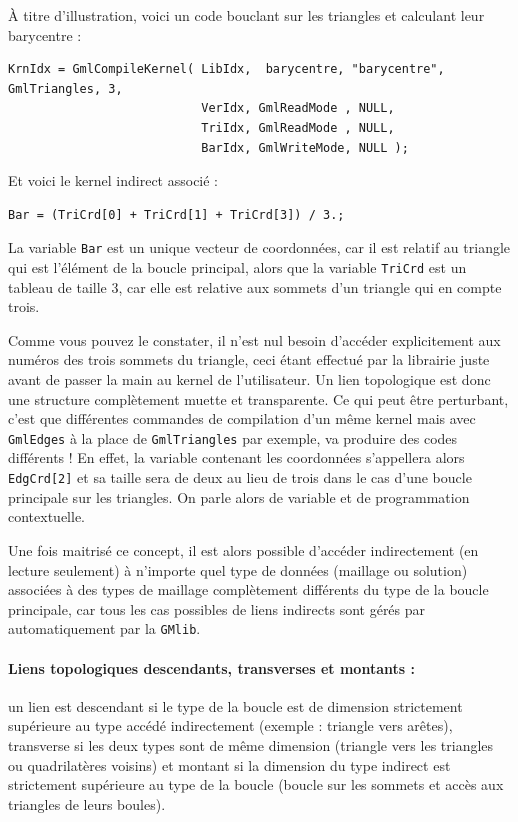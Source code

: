 \documentclass[a4paper,12pt]{article}
\begin{document}
À titre d'illustration, voici un code bouclant sur les triangles et calculant leur barycentre :

\begin{tt}
\begin{verbatim}
KrnIdx = GmlCompileKernel( LibIdx,  barycentre, "barycentre", GmlTriangles, 3,
                           VerIdx, GmlReadMode , NULL,
                           TriIdx, GmlReadMode , NULL,
                           BarIdx, GmlWriteMode, NULL );
\end{verbatim}
\end{tt}
\normalfont

Et voici le kernel indirect associé :

\begin{tt}
\begin{verbatim}
Bar = (TriCrd[0] + TriCrd[1] + TriCrd[3]) / 3.;
\end{verbatim}
\end{tt}
\normalfont

La variable {\tt Bar} est un unique vecteur de coordonnées, car il est relatif au triangle qui est l'élément de la boucle principal, alors que la variable {\tt TriCrd} est un tableau de taille 3, car elle est relative aux sommets d'un triangle qui en compte trois.

Comme vous pouvez le constater, il n'est nul besoin d'accéder explicitement aux numéros des trois sommets du triangle, ceci étant effectué par la librairie juste avant de passer la main au kernel de l'utilisateur.
Un lien topologique est donc une structure complètement muette et transparente.
Ce qui peut être perturbant, c'est que différentes commandes de compilation d'un même kernel mais avec {\tt GmlEdges} à la place de {\tt GmlTriangles} par exemple, va produire des codes différents !
En effet, la variable contenant les coordonnées s'appellera alors {\tt EdgCrd[2]} et sa taille sera de deux au lieu de trois dans le cas d'une boucle principale sur les triangles.
On parle alors de variable et de programmation contextuelle.

Une fois maitrisé ce concept, il est alors possible d'accéder indirectement (en lecture seulement) à n'importe quel type de données (maillage ou solution) associées à des types de maillage complètement différents du type de la boucle principale, car tous les cas possibles de liens indirects sont gérés par automatiquement par la {\tt GMlib}.

\paragraph{Liens topologiques descendants, transverses et montants :} un lien est descendant si le type de la boucle est de dimension strictement supérieure au type accédé indirectement (exemple : triangle vers arêtes), transverse si les deux types sont de même dimension (triangle vers les triangles ou quadrilatères voisins) et montant si la dimension du type indirect est strictement supérieure au type de la boucle (boucle sur les sommets et accès aux triangles de leurs boules).
\end{document}
